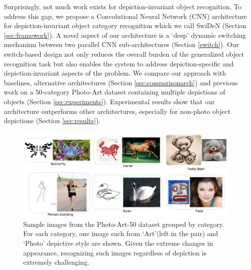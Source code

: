 \documentclass[preprint]{sig-alternate-05-2015}
\begin{document}
Surprisingly, not much work exists for depiction-invariant object recognition. To address this gap, we propose a Convolutional Neural Network (CNN) architecture for depiction-invariant object category recognition which we call SwiDeN (Section \ref{sec:framework}). A novel aspect of our architecture is a `deep' dynamic switching mechanism between two parallel CNN sub-architectures (Section \ref{switch}). Our switch-based design not only reduces the overall burden of the generalized object recognition task but also enables the system to address depiction-specific and depiction-invariant aspects of the problem. We compare our approach with baselines,  alternative architectures (Section \ref{sec:comparisonarch}) and previous work on a $50$-category Photo-Art dataset containing multiple depictions of objects (Section \ref{sec:experiments}). Experimental results show that our architecture outperforms other architectures, especially for non-photo object depictions (Section \ref{sec:results}). 

\begin{figure}[!tbp]
    \centering    
		\includegraphics[width=1.0\linewidth]{photoart-50-mosaic.png}
		\caption{Sample images from the Photo-Art-50 dataset grouped by category. For each category, one image each from `Art'(left in the pair) and `Photo' depictive style are shown. Given the extreme changes in appearance, recognizing such images regardless of depiction is extremely challenging.} 
		\label{fig:datasetpic}    
\end{figure}
\end{document}
